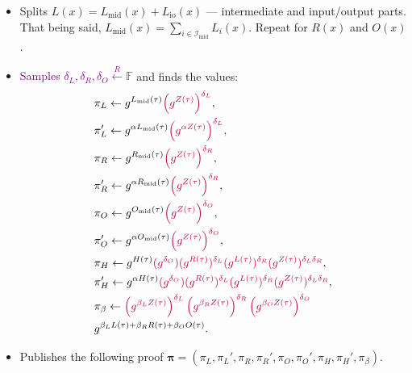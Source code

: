 \documentclass[../lecture-notes.tex]{subfiles}
\begin{document}
\begin{tcolorbox}
\begin{itemize}[label=, left=0.5em]
        \item Splits $L(x) = L_{\text{mid}}(x) + L_{\text{io}}(x)$ --- intermediate and input/output parts. That being said, $L_{\text{mid}}(x) = \sum_{i \in \mathcal{I}_{\text{mid}}}L_i(x)$. Repeat for $R(x)$ and $O(x)$.
        \item \textcolor{purple}{Samples $\delta_L, \delta_R, \delta_O \xleftarrow{R} \mathbb{F}$} and finds the values: 
        \begin{equation*}
            \begin{aligned}
                &\pi_L \gets g^{L_{\text{mid}}(\tau)}\textcolor{purple}{\left(g^{Z(\tau)}\right)^{\delta_L}}, \\ & \pi_L' \gets g^{\alpha L_{\text{mid}}(\tau)}\textcolor{purple}{\left(g^{\alpha Z(\tau)}\right)^{\delta_L}}, \\
                &\pi_R \gets g^{R_{\text{mid}}(\tau)}\textcolor{purple}{\left(g^{Z(\tau)}\right)^{\delta_R}}, \\ & \pi_R' \gets g^{\alpha R_{\text{mid}}(\tau)}\textcolor{purple}{\left(g^{Z(\tau)}\right)^{\delta_R}}, \\
                &\pi_O \gets g^{O_{\text{mid}}(\tau)}\textcolor{purple}{\left(g^{Z(\tau)}\right)^{\delta_O}}, \\ & \pi_O' \gets g^{\alpha O_{\text{mid}}(\tau)}\textcolor{purple}{\left(g^{Z(\tau)}\right)^{\delta_O}}, \\
                &\pi_H \gets g^{H(\tau)}\textcolor{purple}{(g^{\delta_O})(g^{R(\tau)})^{\delta_L}(g^{L(\tau)})^{\delta_R}(g^{Z(\tau)})^{\delta_L\delta_R}}, \\ 
                &\pi_H' \gets g^{\alpha H(\tau)}\textcolor{purple}{(g^{\delta_O})(g^{R(\tau)})^{\delta_L}(g^{L(\tau)})^{\delta_R}(g^{Z(\tau)})^{\delta_L\delta_R}}, \\
                &\pi_{\beta} \gets \textcolor{purple}{\left(g^{\beta_L Z(\tau)}\right)^{\delta_L}\left(g^{\beta_R Z(\tau)}\right)^{\delta_R}\left(g^{\beta_O Z(\tau)}\right)^{\delta_O}} \\ & g^{\beta_LL(\tau) + \beta_RR(\tau) + \beta_OO(\tau)}.
            \end{aligned}
        \end{equation*}
        \item Publishes the following proof $\boldsymbol{\pi} = (\pi_L,\pi_L',\pi_R,\pi_R',\pi_O,\pi_O',\pi_H,\pi_H',\pi_{\beta})$.
    \end{itemize}


\end{tcolorbox}
\end{document}
